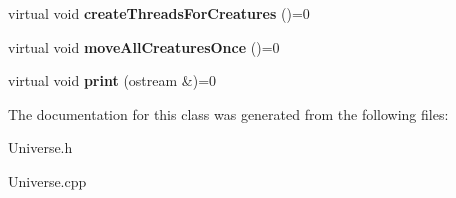 \begin{DoxyCompactItemize}
\item 
virtual void {\bfseries create\+Threads\+For\+Creatures} ()=0\hypertarget{class_universe_ab7d79c7d4f6c76f9f15ba1aec1c81c9f}{}\label{class_universe_ab7d79c7d4f6c76f9f15ba1aec1c81c9f}

\item 
virtual void {\bfseries move\+All\+Creatures\+Once} ()=0\hypertarget{class_universe_af6fafeecd9df7c0c2b83760cef4eced3}{}\label{class_universe_af6fafeecd9df7c0c2b83760cef4eced3}

\item 
virtual void {\bfseries print} (ostream \&)=0\hypertarget{class_universe_a646c85dce1a89e8da9b7f8c7c71cb2e3}{}\label{class_universe_a646c85dce1a89e8da9b7f8c7c71cb2e3}

\end{DoxyCompactItemize}


The documentation for this class was generated from the following files\+:\begin{DoxyCompactItemize}
\item 
Universe.\+h\item 
Universe.\+cpp\end{DoxyCompactItemize}
